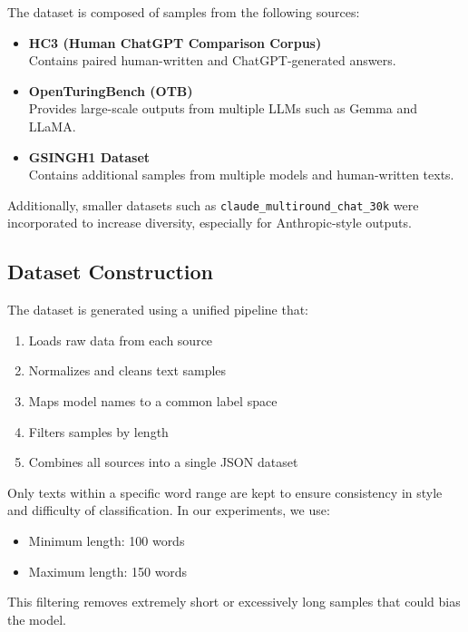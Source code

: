 \documentclass[11pt,a4paper]{article}
\begin{document}
The dataset is composed of samples from the following sources:

\begin{itemize}
    \item \textbf{HC3 (Human ChatGPT Comparison Corpus)} \\
    Contains paired human-written and ChatGPT-generated answers.
    
    \item \textbf{OpenTuringBench (OTB)} \\
    Provides large-scale outputs from multiple LLMs such as Gemma and LLaMA.
    
    \item \textbf{GSINGH1 Dataset} \\
    Contains additional samples from multiple models and human-written texts.
\end{itemize}

Additionally, smaller datasets such as \texttt{claude\_multiround\_chat\_30k} were incorporated to increase diversity, especially for Anthropic-style outputs.

\subsection{Dataset Construction}

The dataset is generated using a unified pipeline that:

\begin{enumerate}
    \item Loads raw data from each source
    \item Normalizes and cleans text samples
    \item Maps model names to a common label space
    \item Filters samples by length
    \item Combines all sources into a single JSON dataset
\end{enumerate}

Only texts within a specific word range are kept to ensure consistency in style and difficulty of classification. In our experiments, we use:

\begin{itemize}
    \item Minimum length: 100 words
    \item Maximum length: 150 words
\end{itemize}

This filtering removes extremely short or excessively long samples that could bias the model.
\end{document}
